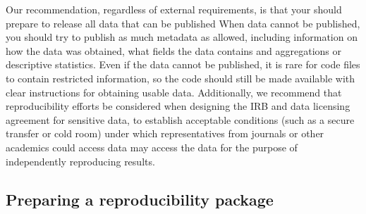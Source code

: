 \documentclass[
]{book}
\begin{document}
Our recommendation, regardless of external requirements,
is that your should prepare to release all data that can be published
When data cannot be published, you should try to publish as much metadata as allowed,
including information on how the data was obtained,
what fields the data contains and aggregations or descriptive statistics.
Even if the data cannot be published,
it is rare for code files to contain restricted information,
so the code should still be made available with clear instructions for obtaining usable data.
Additionally, we recommend that reproducibility efforts be considered
when designing the IRB and data licensing agreement for sensitive data,
to establish acceptable conditions (such as a secure transfer or cold room)
under which representatives from journals or other academics could access data
may access the data for the purpose of independently reproducing results.

\hypertarget{preparing-a-reproducibility-package}{%
\subsection*{Preparing a reproducibility package}\label{preparing-a-reproducibility-package}}
\end{document}
